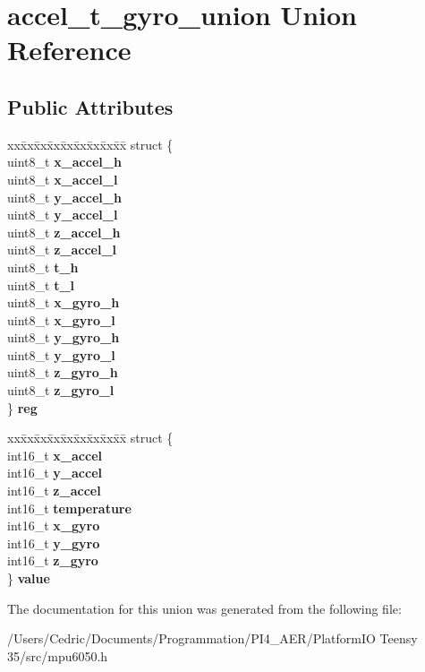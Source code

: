 \hypertarget{unionaccel__t__gyro__union}{}\section{accel\+\_\+t\+\_\+gyro\+\_\+union Union Reference}
\label{unionaccel__t__gyro__union}
\subsection*{Public Attributes}
\begin{DoxyCompactItemize}
\item 
\mbox{\label{unionaccel__t__gyro__union_aff01bea0bb53539163866eee15ee7d4f}} 
\begin{tabbing}
xx\=xx\=xx\=xx\=xx\=xx\=xx\=xx\=xx\=\kill
struct \{\\
\>uint8\_t {\bfseries x\_accel\_h}\\
\>uint8\_t {\bfseries x\_accel\_l}\\
\>uint8\_t {\bfseries y\_accel\_h}\\
\>uint8\_t {\bfseries y\_accel\_l}\\
\>uint8\_t {\bfseries z\_accel\_h}\\
\>uint8\_t {\bfseries z\_accel\_l}\\
\>uint8\_t {\bfseries t\_h}\\
\>uint8\_t {\bfseries t\_l}\\
\>uint8\_t {\bfseries x\_gyro\_h}\\
\>uint8\_t {\bfseries x\_gyro\_l}\\
\>uint8\_t {\bfseries y\_gyro\_h}\\
\>uint8\_t {\bfseries y\_gyro\_l}\\
\>uint8\_t {\bfseries z\_gyro\_h}\\
\>uint8\_t {\bfseries z\_gyro\_l}\\
\} {\bfseries reg}\\

\end{tabbing}\item 
\mbox{\label{unionaccel__t__gyro__union_abcafd934877c6ac62069a191257c5524}} 
\begin{tabbing}
xx\=xx\=xx\=xx\=xx\=xx\=xx\=xx\=xx\=\kill
struct \{\\
\>int16\_t {\bfseries x\_accel}\\
\>int16\_t {\bfseries y\_accel}\\
\>int16\_t {\bfseries z\_accel}\\
\>int16\_t {\bfseries temperature}\\
\>int16\_t {\bfseries x\_gyro}\\
\>int16\_t {\bfseries y\_gyro}\\
\>int16\_t {\bfseries z\_gyro}\\
\} {\bfseries value}\\

\end{tabbing}\end{DoxyCompactItemize}


The documentation for this union was generated from the following file\+:\begin{DoxyCompactItemize}
\item 
/\+Users/\+Cedric/\+Documents/\+Programmation/\+P\+I4\+\_\+\+A\+E\+R/\+Platform\+I\+O Teensy 35/src/mpu6050.\+h\end{DoxyCompactItemize}
